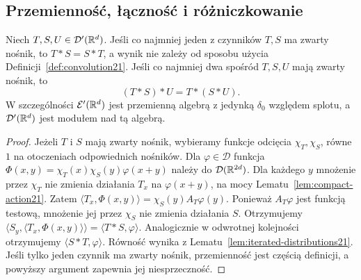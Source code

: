 \subsection{Przemienność, łączność i różniczkowanie}

\begin{twierdzenie}
\label{thm:convolution-algebra21}
Niech $T,S,U\in\mathcal D'(\mathbb R^d)$.
Jeśli co najmniej jeden z czynników $T,S$ ma zwarty nośnik,
to $T*S=S*T$, a wynik nie zależy od sposobu użycia
Definicji~\ref{def:convolution21}. Jeśli co najmniej dwa
spośród $T,S,U$ mają zwarty nośnik, to
\[
 (T*S)*U=T*(S*U).
\]
W szczególności $\mathcal E'(\mathbb R^d)$ jest przemienną
algebrą z jedynką $\delta_0$ względem splotu,
a $\mathcal D'(\mathbb R^d)$ jest modułem nad tą algebrą.
\end{twierdzenie}
\begin{proof}
Jeżeli $T$ i $S$ mają zwarty nośnik, wybieramy funkcje
odcięcia $\chi_T,\chi_S$, równe $1$ na otoczeniach
odpowiednich nośników. Dla $\varphi\in\mathcal D$ funkcja
$\Phi(x,y)=\chi_T(x)\chi_S(y)\varphi(x+y)$
należy do $\mathcal D(\mathbb R^{2d})$. Dla każdego $y$
mnożenie przez $\chi_T$ nie zmienia działania $T_x$
na $\varphi(x+y)$, na mocy Lematu~\ref{lem:compact-action21}.
Zatem $\langle T_x,\Phi(x,y)\rangle=\chi_S(y)A_T\varphi(y)$.
Ponieważ $A_T\varphi$ jest funkcją testową, mnożenie jej
przez $\chi_S$ nie zmienia działania $S$. Otrzymujemy
$\langle S_y,\langle T_x,\Phi(x,y)\rangle\rangle
=\langle T*S,\varphi\rangle$. Analogicznie w odwrotnej
kolejności otrzymujemy $\langle S*T,\varphi\rangle$.
Równość wynika z Lematu~\ref{lem:iterated-distributions21}.
Jeśli tylko jeden czynnik ma zwarty nośnik,
przemienność jest częścią definicji, a powyższy
argument zapewnia jej niesprzeczność.


\end{proof}
